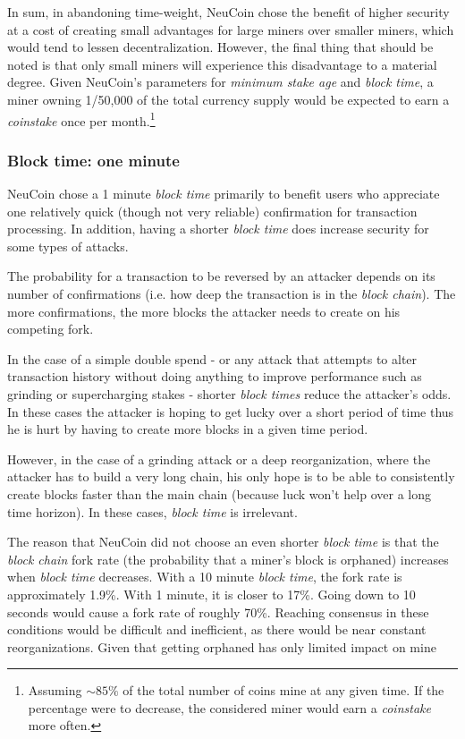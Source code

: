 \documentclass[a4paper,11pt]{article}
\begin{document}
In sum, in abandoning time-weight, NeuCoin chose the benefit of higher security at a cost of creating small advantages for large miners over smaller miners, which would tend to lessen decentralization. However, the final thing that should be noted is that only small miners will experience this disadvantage to a material degree. Given NeuCoin's parameters for \textit{minimum stake age} and \textit{block time}, a miner owning 1/50,000 of the total currency supply would be expected to earn a \textit{coinstake} once per month.\footnote{Assuming $\sim85\%$ of the total number of coins mine at any given time. If the percentage were to decrease, the considered miner would earn a \textit{coinstake} more often. }


\subsubsection*{Block time: one minute}

NeuCoin chose a 1 minute \textit{block time} primarily to benefit users who appreciate one relatively quick (though not very reliable) confirmation for transaction processing. In addition, having a shorter \textit{block time} does increase security for some types of attacks.

The probability for a transaction to be reversed by an attacker depends on its number of confirmations (i.e. how deep the transaction is in the \textit{block chain}). The more confirmations, the more blocks the attacker needs to create on his competing fork.

In the case of a simple double spend - or any attack that attempts to alter transaction history without doing anything to improve performance such as grinding or supercharging stakes - shorter \textit{block times} reduce the attacker's odds. In these cases the attacker is hoping to get lucky over a short period of time thus he is hurt by having to create more blocks in a given time period.

However, in the case of a grinding attack or a deep reorganization, where the attacker has to build a very long chain, his only hope is to be able to consistently create blocks faster than the main chain (because luck won't help over a long time horizon). In these cases, \textit{block time} is irrelevant.

The reason that NeuCoin did not choose an even shorter \textit{block time} is that the \textit{block chain} fork rate (the probability that a miner's block is orphaned) increases when \textit{block time} decreases. With a 10 minute \textit{block time}, the fork rate is approximately 1.9\%. With 1 minute, it is closer to 17\%. Going down to 10 seconds would cause a fork rate of roughly 70\%\cite{decker2013information}. Reaching consensus in these conditions would be difficult and inefficient, as there would be near constant reorganizations. Given that getting orphaned has only limited impact on mine
\end{document}
